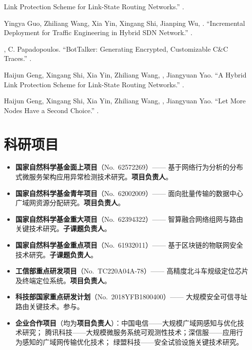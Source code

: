 \documentclass[11pt]{article}
\begin{document}
\begin{publist}
Link Protection Scheme for Link-State Routing Networks.'' .
\item Yingya Guo, Zhiliang Wang, Xia Yin, Xingang Shi, Jianping Wu, .
``Incremental Deployment for Traffic Engineering in Hybrid SDN Network.''
.
\item {}, C. Papadopoulos. ``BotTalker: Generating Encrypted, Customizable
C\&C Traces.'' .
\item Haijun Geng, Xingang Shi, Xia Yin, Zhiliang Wang, , Jiangyuan Yao.
``A Hybrid Link Protection Scheme for Link-State Routing Networks.''
.
\item Haijun Geng, Xingang Shi, Xia Yin, Zhiliang Wang, , Jiangyuan Yao.
``Let More Nodes Have a Second Choice.'' .
\end{publist}

\section{科研项目}
\begin{itemize}
  \item \textbf{国家自然科学基金面上项目}（No.~62572269）——
        基于网络行为分析的分布式微服务架构应用异常检测技术研究。\textbf{项目负责人}。
  \item \textbf{国家自然科学基金青年项目}（No.~62002009）——
        面向批量传输的数据中心广域网资源分配研究。\textbf{项目负责人}。
  \item \textbf{国家自然科学基金重大项目}（No.~62394322）——
        智算融合网络组网与路由关键技术研究。\textbf{子课题负责人}。
  \item \textbf{国家自然科学基金重点项目}（No.~61932011）——
        基于区块链的物联网安全技术研究。\textbf{子课题负责人}。
  \item \textbf{工信部重点研发项目}（No.~TC220A04A-78）——
        高精度北斗车规级定位芯片及终端定位系统。\textbf{项目负责人}。
  \item \textbf{科技部国家重点研发计划}（No.~2018YFB1800400）——
        大规模安全可信寻址路由关键技术。参与。
  \item \textbf{企业合作项目}（均为\textbf{项目负责人}）：中国电信——大规模广域网感知与优化技术研究；
        腾讯科技——大规模微服务系统可观测性技术；深信服——应用行为感知的广域网传输优化技术；
        绿盟科技——安全试验设施关键技术研究。
\end{itemize}
\end{document}
